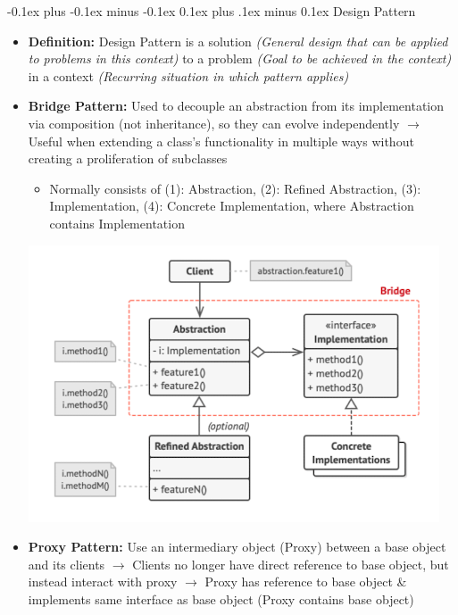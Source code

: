 \documentclass[landscape]{article}
\makeatletter
\renewcommand{\subsection}{\@startsection{subsection}{2}{0mm}%
  {-0.1ex plus -0.1ex minus -0.1ex}%
  {0.1ex plus .1ex minus 0.1ex}%
{\normalfont\scriptsize\bfseries}}
\makeatother
\begin{document}
\begin{multicols*}{5}
    \subsection{Design Pattern}
    \begin{itemize}
      \item \textbf{Definition:} Design Pattern is a solution \textit{(General design that can be applied to problems in this context)} to a problem \textit{(Goal to be achieved in the context)} in a context \textit{(Recurring situation in which pattern applies)}
      \item \textbf{Bridge Pattern:} Used to decouple an abstraction from its implementation via composition (not inheritance), so they can evolve independently $\rightarrow$ Useful when extending a class's functionality in multiple ways without creating a proliferation of subclasses
      \begin{itemize}
        \item Normally consists of (1): Abstraction, (2): Refined Abstraction, (3): Implementation, (4): Concrete Implementation, where Abstraction contains Implementation
      \end{itemize}
      \includegraphics[width=0.7\linewidth]{11_bridge_pattern.png}
      \item \textbf{Proxy Pattern:} Use an intermediary object (Proxy) between a base object and its clients $\rightarrow$ Clients no longer have direct reference to base object, but instead interact with proxy $\rightarrow$ Proxy has reference to base object \& implements same interface as base object (Proxy contains base object)
    \end{itemize}
    

\end{multicols*}
\end{document}
